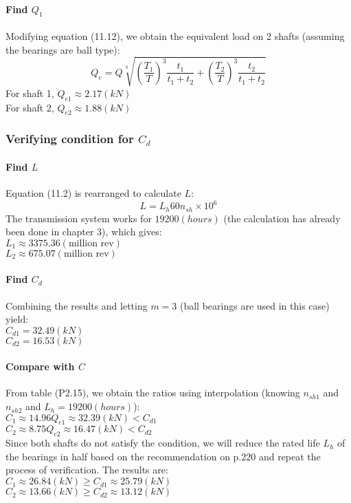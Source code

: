 \paragraph{Find $ Q_1 $} 
Modifying equation (11.12), we obtain the equivalent load on 2 shafts (assuming the bearings are ball type):
\[Q_{e} = Q\sqrt[3]{\left(\dfrac{T_1}{T} \right)^3\dfrac{t_1}{t_1+t_2} + \left(\dfrac{T_2}{T} \right)^3\dfrac{t_2}{t_1+t_2}}\]
For shaft 1, $ Q_{e1}  \approx 2.17\unit{(kN)}  $\\
For shaft 2, $ Q_{e2}  \approx 1.88\unit{(kN)}  $

\subsubsection{Verifying condition for $ C_d $}
\paragraph{Find $ L $}Equation (11.2) is rearranged to calculate $ L $:
\[L = L_h60n_{sh}\times10^6\]
The transmission system works for $ 19200\unit{(hours)} $ (the calculation has already been done in chapter 3), which gives:\\
$ L_1 \approx 3375.36 \unit{(\text{million rev})} $\\
$ L_2 \approx 675.07 \unit{(\text{million rev})} $
\paragraph{Find $ C_d $}
Combining the results and letting $ m=3 $ (ball bearings are used in this case) yield:\\
$ C_{d1} =32.49 \unit{(kN)} $\\
$ C_{d2} = 16.53 \unit{(kN)} $

\paragraph{Compare with $ C $}
From table (P2.15), we obtain the ratios using interpolation (knowing $ n_{sh1} $ and $ n_{sh2} $ and $ L_h=19200\unit{(hours)} $):\\
$ C_1 \approx  14.96 Q_{e1} \approx 32.39\unit{(kN)} < C_{d1}$\\
$ C_2 \approx  8.75 Q_{e2} \approx 16.47\unit{(kN)} < C_{d2}$\\
Since both shafts do not satisfy the condition, we will reduce the rated life $ L_h $ of the bearings in half based on the recommendation on p.220 and repeat the process of verification. The results are:\\
$ C_1 \approx  26.84 \unit{(kN)} \geq C_{d1} \approx 25.79\unit{(kN)}$\\
$ C_2 \approx 13.66 \unit{(kN)} \geq C_{d2} \approx 13.12\unit{(kN)}$
